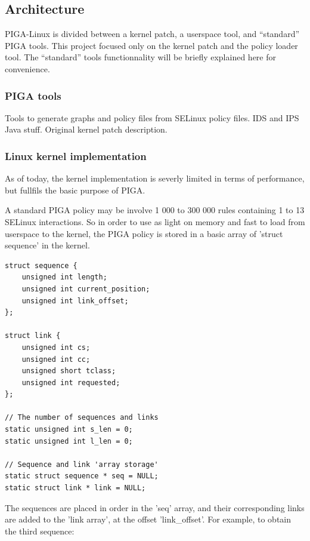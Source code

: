 \documentclass[pdftex,a4paper,titlepage,11pt]{article}
\begin{document}
\subsection{Architecture}

PIGA-Linux is divided between a kernel patch, a userspace tool, and ``standard'' PIGA tools. This project focused only on the kernel patch and the policy loader tool. The ``standard'' tools functionnality will be briefly explained here for convenience.

\subsubsection{PIGA tools}

Tools to generate graphs and policy files from SELinux policy files. IDS and IPS Java stuff. Original kernel patch description.

\subsubsection{Linux kernel implementation}

As of today, the kernel implementation is severly limited in terms of performance, but fullfils the basic purpose of PIGA.

\bigskip

A standard PIGA policy may be involve 1 000 to 300 000 rules containing 1 to 13 SELinux interactions. So in order to use as light on memory and fast to load from userspace to the kernel, the PIGA policy is stored in a basic array of 'struct sequence' in the kernel.

\begin{lstlisting}
struct sequence {
	unsigned int length;
	unsigned int current_position;
	unsigned int link_offset;
};

struct link {
	unsigned int cs;
	unsigned int cc;
	unsigned short tclass;
	unsigned int requested;
};

// The number of sequences and links
static unsigned int s_len = 0;
static unsigned int l_len = 0;

// Sequence and link 'array storage'
static struct sequence * seq = NULL;
static struct link * link = NULL;
\end{lstlisting}

\smallskip

The sequences are placed in order in the 'seq' array, and their corresponding links are added to the 'link array', at the offset 'link\_offset'. For example, to obtain the third sequence:
\end{document}
